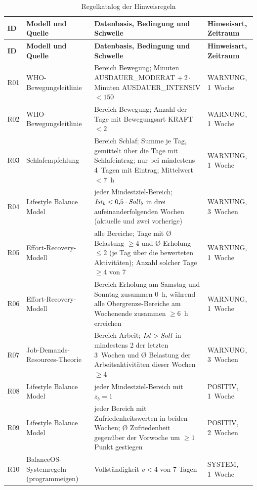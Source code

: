 \begin{longtable}{@{}L{0.9cm}L{4.1cm}L{7.6cm}L{2.6cm}@{}}
  \caption{Regelkatalog der Hinweisregeln}\label{tab:regeln}\\
  \toprule
  \textbf{ID} & \textbf{Modell und Quelle} & \textbf{Datenbasis, Bedingung und Schwelle} & \textbf{Hinweisart, Zeitraum} \\
  \midrule
  \endfirsthead
  \toprule
  \textbf{ID} & \textbf{Modell und Quelle} & \textbf{Datenbasis, Bedingung und Schwelle} & \textbf{Hinweisart, Zeitraum} \\
  \midrule
  \endhead
  \bottomrule
  \endfoot
  R01 & WHO-Bewegungs\-leitlinie \parencite[S.~1451]{bull2020} & Bereich Bewegung; Minuten AUSDAUER\_MODERAT $+\ 2 \cdot$ Minuten AUSDAUER\_INTENSIV $< 150$ & WARNUNG, 1~Woche \\
  R02 & WHO-Bewegungs\-leitlinie \parencite[S.~1451]{bull2020} & Bereich Bewegung; Anzahl der Tage mit Bewegungsart KRAFT $< 2$ & WARNUNG, 1~Woche \\
  R03 & Schlafempfehlung \parencite[S.~843]{watson2015} & Bereich Schlaf; Summe je Tag, gemittelt über die Tage mit Schlafeintrag; nur bei mindestens 4~Tagen mit Eintrag; Mittelwert $< 7$~h & WARNUNG, 1~Woche \\
  R04 & Lifestyle Balance Model \parencite[S.~11]{matuska2008} & jeder Mindestziel-Bereich; $\mathit{Ist}_b < 0{,}5 \cdot \mathit{Soll}_b$ in drei aufeinanderfolgenden Wochen (aktuelle und zwei vorherige) & WARNUNG, 3~Wochen \\
  R05 & Effort-Recovery-Modell \parencite[S.~5--33]{meijman1998} & alle Bereiche; Tage mit Ø Belastung $\geq 4$ und Ø Erholung $\leq 2$ (je Tag über die bewerteten Aktivitäten); Anzahl solcher Tage $\geq 4$ von 7 & WARNUNG, 1~Woche \\
  R06 & Effort-Recovery-Modell \parencite[S.~5--33]{meijman1998} & Bereich Erholung am Samstag und Sonntag zusammen 0~h, während alle Obergrenze-Bereiche am Wochenende zusammen $\geq 6$~h erreichen & WARNUNG, 1~Woche \\
  R07 & Job-Demands-Resources-Theorie \parencite[S.~274]{bakker2017} & Bereich Arbeit; $\mathit{Ist} > \mathit{Soll}$ in mindestens 2 der letzten 3~Wochen und Ø Belastung der Arbeitsaktivitäten dieser Wochen $\geq 4$ & WARNUNG, 3~Wochen \\
  R08 & Lifestyle Balance Model \parencite[S.~11]{matuska2008} & jeder Mindestziel-Bereich mit $z_b = 1$ & POSITIV, 1~Woche \\
  R09 & Lifestyle Balance Model \parencite[S.~11]{matuska2008} & jeder Bereich mit Zufriedenheitswerten in beiden Wochen; Ø Zufriedenheit gegenüber der Vorwoche um $\geq 1$ Punkt gestiegen & POSITIV, 2~Wochen \\
  R10 & BalanceOS-System\-regeln (programmeigen) & Vollständigkeit $v < 4$ von 7 Tagen & SYSTEM, 1~Woche \\
\end{longtable}

